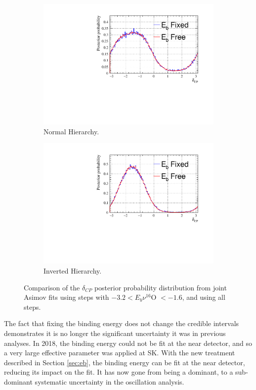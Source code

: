\begin{figure}[!htbp]
\centering
\begin{subfigure}{.7\textwidth}
  \centering
  \includegraphics[width=0.95\linewidth]{figs/compMaCh3Contours_EB_asimov/compMaCh3Contours_EB_dcp_asimovA_NH}
  \caption{Normal Hierarchy.}
  \label{fig:EBdcpNH}
\end{subfigure}
\begin{subfigure}{.7\textwidth}
  \centering
  \includegraphics[width=0.95\linewidth]{figs/compMaCh3Contours_EB_asimov/compMaCh3Contours_EB_dcp_asimovA_IH}
  \caption{Inverted Hierarchy.}
  \label{fig:EBdcpIH}
\end{subfigure}
\caption{Comparison of the $\delta_{CP}$ posterior probability distribution from joint Asimov fits using steps with $ -3.2 < E_b \nu ^{16}$O $< -1.6$, and using all steps.}
\label{fig:EBdcp}
\end{figure}

The fact that fixing the binding energy does not change the credible intervals demonstrates it is no longer the significant uncertainty it was in previous analyses. In 2018, the binding energy could not be fit at the near detector, and so a very large effective parameter was applied at SK. With the new treatment described in Section \ref{sec:eb}, the binding energy can be fit at the near detector, reducing its impact on the fit. It has now gone from being a dominant, to a sub-dominant systematic uncertainty in the oscillation analysis.

\newpage
